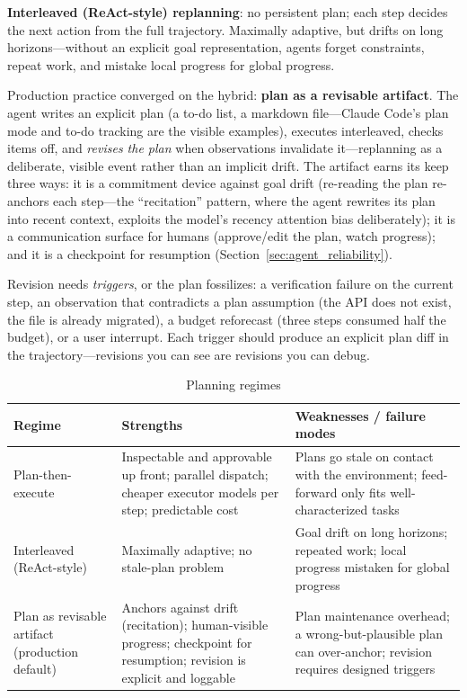 \textbf{Interleaved (ReAct-style) replanning}: no persistent plan; each step decides the next action from the full trajectory. Maximally adaptive, but drifts on long horizons---without an explicit goal representation, agents forget constraints, repeat work, and mistake local progress for global progress.

Production practice converged on the hybrid: \textbf{plan as a revisable artifact}. The agent writes an explicit plan (a to-do list, a markdown file---Claude Code's plan mode and to-do tracking are the visible examples), executes interleaved, checks items off, and \textit{revises the plan} when observations invalidate it---replanning as a deliberate, visible event rather than an implicit drift. The artifact earns its keep three ways: it is a commitment device against goal drift (re-reading the plan re-anchors each step---the ``recitation'' pattern, where the agent rewrites its plan into recent context, exploits the model's recency attention bias deliberately); it is a communication surface for humans (approve/edit the plan, watch progress); and it is a checkpoint for resumption (Section~\ref{sec:agent_reliability}).

Revision needs \textit{triggers}, or the plan fossilizes: a verification failure on the current step, an observation that contradicts a plan assumption (the API does not exist, the file is already migrated), a budget reforecast (three steps consumed half the budget), or a user interrupt. Each trigger should produce an explicit plan diff in the trajectory---revisions you can see are revisions you can debug.

\begin{table}[H]
\centering
\caption{Planning regimes}
\label{tab:planning_regimes}
\begin{tabularx}{\textwidth}{p{3.0cm}XX}
\toprule
\textbf{Regime} & \textbf{Strengths} & \textbf{Weaknesses / failure modes} \\
\midrule
Plan-then-execute & Inspectable and approvable up front; parallel dispatch; cheaper executor models per step; predictable cost & Plans go stale on contact with the environment; feed-forward only fits well-characterized tasks \\
Interleaved (ReAct-style) & Maximally adaptive; no stale-plan problem & Goal drift on long horizons; repeated work; local progress mistaken for global progress \\
Plan as revisable artifact (production default) & Anchors against drift (recitation); human-visible progress; checkpoint for resumption; revision is explicit and loggable & Plan maintenance overhead; a wrong-but-plausible plan can over-anchor; revision requires designed triggers \\
\bottomrule
\end{tabularx}
\end{table}

